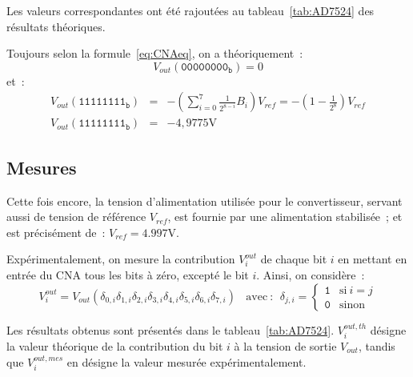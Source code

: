 \documentclass{article}
\begin{document}
Les valeurs correspondantes ont été rajoutées au tableau~\ref{tab:AD7524} des résultats théoriques.


Toujours selon la formule~\ref{eq:CNAeq}, on a théoriquement~:
\begin{equation*}
V_{out}(\mathtt{00000000_b}) = 0
\end{equation*}
et~:
\begin{eqnarray*}
V_{out}(\mathtt{11111111_b}) &=& -\left(\sum_{i=0}^{7}\frac{1}{2^{8-i}}B_i\right)V_{ref} = -(1-\frac{1}{2^8})V_{ref}\\
V_{out}(\mathtt{11111111_b}) &=& -4,9775\mathrm{V}
\end{eqnarray*}


\subsection{Mesures}


Cette fois encore, la tension d'alimentation utilisée pour le convertisseur, servant aussi de tension de référence $V_{ref}$, est fournie par une alimentation stabilisée~; et est précisément de~: ${V_{ref}=\mathrm{4.997 V}}$.



Expérimentalement, on mesure la contribution $V_i^{out}$ de chaque bit $i$ en mettant en entrée du CNA tous les bits à zéro, excepté le bit $i$. Ainsi, on considère~:
\begin{equation*}
V_i^{out} = V_{out}(\delta_{0,i}\delta_{1,i}\delta_{2,i}\delta_{3,i}\delta_{4,i}\delta_{5,i}\delta_{6,i}\delta_{7,i}) \mathrm{~~~~avec~:~~}\delta_{j,i} = \begin{cases} \mathtt{1} &\mathrm{si~} i=j \\ \mathtt{0} & \mbox{sinon}\end{cases}
\end{equation*}

Les résultats obtenus sont présentés dans le tableau~\ref{tab:AD7524}. $V_i^{out,th}$ désigne la valeur théorique de la contribution du bit $i$ à la tension de sortie $V_{out}$, tandis que $V_i^{out,mes}$ en désigne la valeur mesurée expérimentalement.

\end{document}
